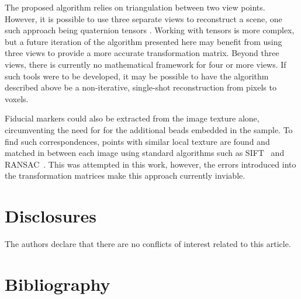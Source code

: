 \documentclass{osa-article}
\begin{document}
The proposed algorithm relies on triangulation between two view points.
However, it is possible to use three separate views %
to reconstruct a scene, one such approach being quaternion tensors \cite{hartleyMultipleViewGeometry}.
Working with tensors is more complex, but a future iteration of the algorithm presented here may benefit from using three views to provide a more accurate transformation matrix.
Beyond three views, there is currently no mathematical framework for four or more views.
If such tools were to be developed, it may be possible to have the algorithm described above be a non-iterative, single-shot reconstruction from pixels to voxels.

Fiducial markers could also be extracted from the image texture alone, circumventing the need for for the additional beads embedded in the sample.
To find such correspondences, points with similar local texture are found and matched in between each image using standard algorithms such as SIFT~\cite{loweObjectRecognitionLocal1999} and RANSAC~\cite{fischlerRandomSampleConsensus1981}. %
This was attempted in this work, however, the errors introduced into the transformation matrices make this approach currently inviable.



\section*{Disclosures}
The authors declare that there are no conflicts of interest related to this article.

\section*{Bibliography}
% 
% 

\end{document}
